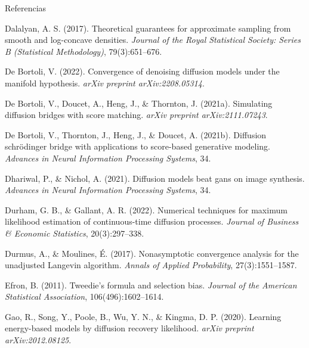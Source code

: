 \documentclass[aspectratio=169,xcolor=dvipsnames, t, spanish]{beamer}
\begin{document}
\begin{frame}{Referencias}
{\begin{thebibliography}{99}
             Dalalyan, A. S. (2017).
            \newblock Theoretical guarantees for approximate sampling from smooth and log-concave densities.
            \newblock \emph{Journal of the Royal Statistical Society: Series B (Statistical Methodology)}, 79(3):651–676.

             De Bortoli, V. (2022).
            \newblock Convergence of denoising diffusion models under the manifold hypothesis.
            \newblock \emph{arXiv preprint arXiv:2208.05314}.

             De Bortoli, V., Doucet, A., Heng, J., \& Thornton, J. (2021a).
            \newblock Simulating diffusion bridges with score matching.
            \newblock \emph{arXiv preprint arXiv:2111.07243}.

             De Bortoli, V., Thornton, J., Heng, J., \& Doucet, A. (2021b).
            \newblock Diffusion schrödinger bridge with applications to score-based generative modeling.
            \newblock \emph{Advances in Neural Information Processing Systems}, 34.

             Dhariwal, P., \& Nichol, A. (2021).
            \newblock Diffusion models beat gans on image synthesis.
            \newblock \emph{Advances in Neural Information Processing Systems}, 34.

             Durham, G. B., \& Gallant, A. R. (2022).
            \newblock Numerical techniques for maximum likelihood estimation of continuous-time diffusion processes.
            \newblock \emph{Journal of Business \& Economic Statistics}, 20(3):297–338.

             Durmus, A., \& Moulines, É. (2017).
            \newblock Nonasymptotic convergence analysis for the unadjusted Langevin algorithm.
            \newblock \emph{Annals of Applied Probability}, 27(3):1551–1587.

             Efron, B. (2011).
            \newblock Tweedie's formula and selection bias.
            \newblock \emph{Journal of the American Statistical Association}, 106(496):1602–1614.
            
             Gao, R., Song, Y., Poole, B., Wu, Y. N., \& Kingma, D. P. (2020).
            \newblock Learning energy-based models by diffusion recovery likelihood.
            \newblock \emph{arXiv preprint arXiv:2012.08125}.
            

\end{thebibliography}}
\end{frame}
\end{document}
